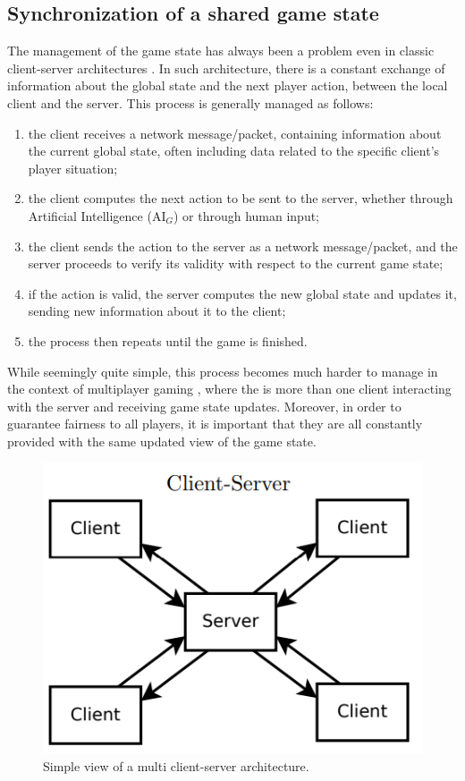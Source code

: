 \subsection{Synchronization of a shared game state}
The management of the game state has always been a problem even in classic client-server architectures \cite{womak:distributed-game-engine-android, womak:distributed-minecraft}. In such architecture, there is a constant exchange of information about the global state and the next player action, between the local client and the server. This process is generally managed as follows:
\begin{enumerate}
	\item the client receives a network message/packet, containing information about the current global state, often including data related to the specific client's player situation;
	\item the client computes the next action to be sent to the server, whether through Artificial Intelligence (AI$_G$) or through human input;
	\item the client sends the action to the server as a network message/packet, and the server proceeds to verify its validity with respect to the current game state;
	\item if the action is valid, the server computes the new global state and updates it, sending new information about it to the client;
	\item the process then repeats until the game is finished.
\end{enumerate}
While seemingly quite simple, this process becomes much harder to manage in the context of multiplayer gaming \cite{womak:rafting-multiplayer-games, womak:distributed-game-engine-android}, where the is more than one client interacting with the server and receiving game state updates. Moreover, in order to guarantee fairness to all players, it is important that they are all constantly provided with the same updated view of the game state.
\begin{figure}[h!]
	\centering
	\includegraphics[width=0.55\linewidth]{immagini/State-of-the-art/simple-client-server}
	\caption[Simple view of a multi client-server architecture.]{Simple view of a multi client-server architecture.}
	\label{fig:simple-client-server}
\end{figure}
